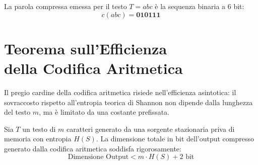 \begin{table}[H]
\centering
\small
\caption{Tracciamento iterativo delle moltiplicazioni per 2 eseguite da \texttt{CONVERTER}($23/64, 6$).}
\label{tab:tracciamento-converter}
\end{table}

La parola compressa emessa per il testo $T = abc$ \`e la sequenza binaria a 6 bit:
\begin{equation}
  c(abc) = \mathbf{010111}
\end{equation}

\FloatBarrier
\section[Efficienza della Codifica Aritmetica]{Teorema sull'Efficienza\\della Codifica Aritmetica}
\label{sec:teorema-efficienza-aritmetica}

Il pregio cardine della codifica aritmetica risiede nell'efficienza asintotica: il sovraccosto rispetto all'entropia teorica di Shannon non dipende dalla lunghezza del testo $m$, ma \`e limitato da una costante prefissata.

\begin{theorem}
\label{thm:efficienza-aritmetica}
Sia $T$ un testo di $m$ caratteri generato da una sorgente stazionaria priva di memoria con entropia $H(S)$. La dimensione totale in bit dell'output compresso generato dalla codifica aritmetica soddisfa rigorosamente:
\begin{equation}
  \text{Dimensione Output} < m \cdot H(S) + 2\text{ bit}
\end{equation}
\end{theorem}

